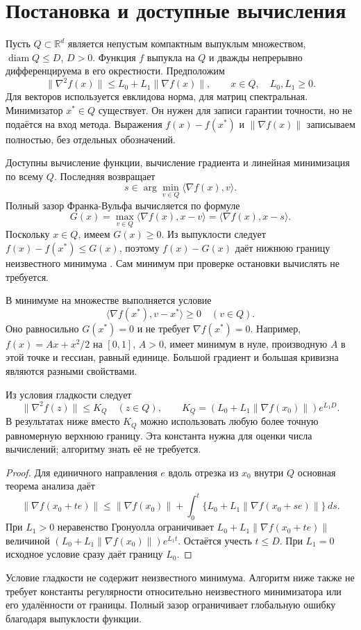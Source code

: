 \section{Постановка и доступные вычисления}
\label{sec:model}
Пусть $Q\subset\mathbb R^d$ является непустым компактным выпуклым
множеством, $\operatorname{diam}Q\le D$, $D>0$. Функция $f$ выпукла
на $Q$ и дважды непрерывно дифференцируема в его окрестности. Предположим
\begin{equation}\label{eq:gradient_smoothness}
 \|\nabla^2f(x)\|\le L_0+L_1\|\nabla f(x)\|,\qquad x\in Q,
 \quad L_0,L_1\ge0.
\end{equation}
Для векторов используется евклидова норма, для матриц спектральная.
Минимизатор $x^*\in Q$ существует. Он нужен для записи гарантии
точности, но не подаётся на вход метода. Выражения $f(x)-f(x^*)$ и
$\|\nabla f(x)\|$ записываем полностью, без отдельных обозначений.

Доступны вычисление функции, вычисление градиента и линейная
минимизация по всему $Q$. Последняя возвращает
\[
 s\in\arg\min_{v\in Q}\langle\nabla f(x),v\rangle.
\]
Полный зазор Франка-Вульфа вычисляется по формуле
\begin{equation}\label{eq:gap}
 G(x)=\max_{v\in Q}\langle\nabla f(x),x-v\rangle
     =\langle\nabla f(x),x-s\rangle.
\end{equation}
Поскольку $x\in Q$, имеем $G(x)\ge0$. Из выпуклости следует
$f(x)-f(x^*)\le G(x)$, поэтому $f(x)-G(x)$ даёт нижнюю границу
неизвестного минимума \cite{jaggi}. Сам минимум при проверке остановки
вычислять не требуется.

В минимуме на множестве выполняется условие
\[
 \langle\nabla f(x^*),v-x^*\rangle\ge0\quad(v\in Q).
\]
Оно равносильно $G(x^*)=0$ и не требует $\nabla f(x^*)=0$.
Например, $f(x)=Ax+x^2/2$ на $[0,1]$, $A>0$, имеет минимум в нуле,
производную $A$ в этой точке и гессиан, равный единице.
Большой градиент и большая кривизна являются разными свойствами.

\begin{lemma}
\label{lem:global_curvature}
Из условия гладкости следует
\begin{equation}\label{eq:global_curvature}
 \|\nabla^2f(z)\|\le K_Q\quad(z\in Q),\qquad
 K_Q=(L_0+L_1\|\nabla f(x_0)\|)e^{L_1D}.
\end{equation}
В результатах ниже вместо $K_Q$ можно использовать любую более точную
равномерную верхнюю границу. Эта константа нужна для оценки числа
вычислений; алгоритму знать её не требуется.
\end{lemma}
\begin{proof}
Для единичного направления $e$ вдоль отрезка из $x_0$ внутри $Q$
основная теорема анализа даёт
\[
 \|\nabla f(x_0+te)\|\le\|\nabla f(x_0)\|
 +\int_0^t\{L_0+L_1\|\nabla f(x_0+se)\|\}\,ds.
\]
При $L_1>0$ неравенство Гронуолла ограничивает
$L_0+L_1\|\nabla f(x_0+te)\|$ величиной
$(L_0+L_1\|\nabla f(x_0)\|)e^{L_1t}$. Остаётся учесть $t\le D$.
При $L_1=0$ исходное условие сразу даёт границу $L_0$.
\end{proof}

Условие гладкости не содержит неизвестного минимума. Алгоритм ниже
также не требует константы регулярности относительно неизвестного
минимизатора или его удалённости от границы. Полный зазор ограничивает
глобальную ошибку благодаря выпуклости функции.
